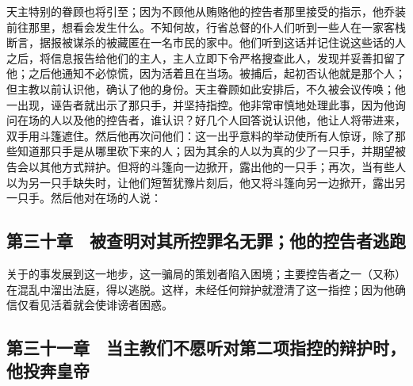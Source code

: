 天主特别的眷顾也将引至；因为不顾他从贿赂他的控告者那里接受的指示，他乔装前往那里，想看会发生什么。不知何故，行省总督的仆人们听到一些人在一家客栈断言，据报被谋杀的被藏匿在一名市民的家中。他们听到这话并记住说这些话的人之后，将信息报告给他们的主人，主人立即下令严格搜查此人，发现并妥善扣留了他；之后他通知不必惊慌，因为活着且在当场。被捕后，起初否认他就是那个人；但主教以前认识他，确认了他的身份。天主眷顾如此安排后，不久被会议传唤；他一出现，诬告者就出示了那只手，并坚持指控。他非常审慎地处理此事，因为他询问在场的人以及他的控告者，谁认识？好几个人回答说认识他，他让人将带进来，双手用斗篷遮住。然后他再次问他们：这一出乎意料的举动使所有人惊讶，除了那些知道那只手是从哪里砍下来的人；因为其余的人以为真的少了一只手，并期望被告会以其他方式辩护。但将的斗篷向一边掀开，露出他的一只手；再次，当有些人以为另一只手缺失时，让他们短暂犹豫片刻后，他又将斗篷向另一边掀开，露出另一只手。然后他对在场的人说：\par


\subsection{第三十章　被查明对其所控罪名无罪；他的控告者逃跑}

关于的事发展到这一地步，这一骗局的策划者陷入困境；主要控告者之一（又称）在混乱中溜出法庭，得以逃脱。这样，未经任何辩护就澄清了这一指控；因为他确信仅看见活着就会使诽谤者困惑。\par


\subsection{第三十一章　当主教们不愿听对第二项指控的辩护时，他投奔皇帝}

